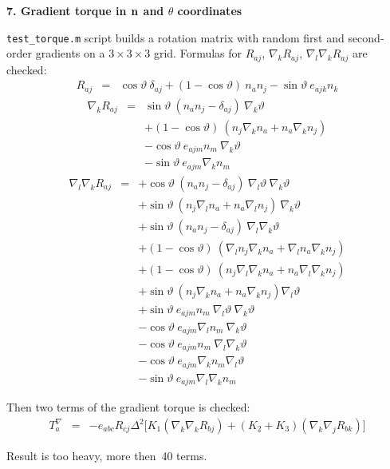 \documentclass[a4paper]{article}
\def\ct{\cos\vartheta}
\def\st{\sin\vartheta}
\begin{document}
{\bf 7. Gradient torque in $\bf n$ and $\theta$ coordinates}

{\tt test\_torque.m} script builds a rotation matrix with
random first and second-order gradients on a $3\times3\times3$ grid.
Formulas for $R_{aj}$, $\nabla_kR_{aj}$, $\nabla_l\nabla_kR_{aj}$ are checked:
\begin{eqnarray}
R_{aj} &=& \ct\ \delta_{aj} + (1-\ct)\ n_a n_j - \st\ e_{ajk}n_k
\end{eqnarray}
\begin{eqnarray}
\nabla_k R_{aj} &=&
\st\ (n_a n_j - \delta_{aj})\ \nabla_k\vartheta
\\\nonumber &&
+ (1-\ct)\ (n_j \nabla_k n_a + n_a \nabla_k n_j)
\\\nonumber &&
- \ct\ e_{ajm} n_m\ \nabla_k\vartheta
\\\nonumber &&
- \st\ e_{ajm} \nabla_k n_m
\end{eqnarray}
\begin{eqnarray}
\nabla_l \nabla_k R_{aj} &=&
+ \ct\ (n_a n_j - \delta_{aj})\ \nabla_l\vartheta\ \nabla_k\vartheta
\\\nonumber &&
+ \st\ (n_j \nabla_l n_a + n_a \nabla_l n_j)\ \nabla_k\vartheta
\\\nonumber &&
+ \st\ (n_a n_j - \delta_{aj})\ \nabla_l\nabla_k\vartheta
\\\nonumber &&
+ (1-\ct)\ (\nabla_l n_j \nabla_k n_a + \nabla_l n_a \nabla_k n_j)
\\\nonumber &&
+ (1-\ct)\ (n_j \nabla_l \nabla_k n_a + n_a \nabla_l \nabla_k n_j)
\\\nonumber &&
+ \st\ (n_j \nabla_k n_a + n_a \nabla_k n_j)\nabla_l\vartheta
\\\nonumber &&
+ \st\ e_{ajm}n_m\ \nabla_l\vartheta\ \nabla_k\vartheta
\\\nonumber &&
- \ct\ e_{ajm}\nabla_l n_m\ \nabla_k\vartheta
\\\nonumber &&
- \ct\ e_{ajm}n_m\ \nabla_l \nabla_k\vartheta
\\\nonumber &&
- \ct\ e_{ajm} \nabla_k n_m \nabla_l\vartheta
\\\nonumber &&
- \st\ e_{ajm} \nabla_l \nabla_k n_m
\end{eqnarray}

Then two terms of the gradient torque is checked:
\begin{eqnarray}
T_a^\nabla
 &=& - e_{abc} R_{cj}
  \Delta^2 \big[
     K_1 (\nabla_k \nabla_k R_{bj})
    + (K_2+K_3) (\nabla_k \nabla_j R_{bk}) \big]
\end{eqnarray}

Result is too heavy, more then~40 terms.
\end{document}
